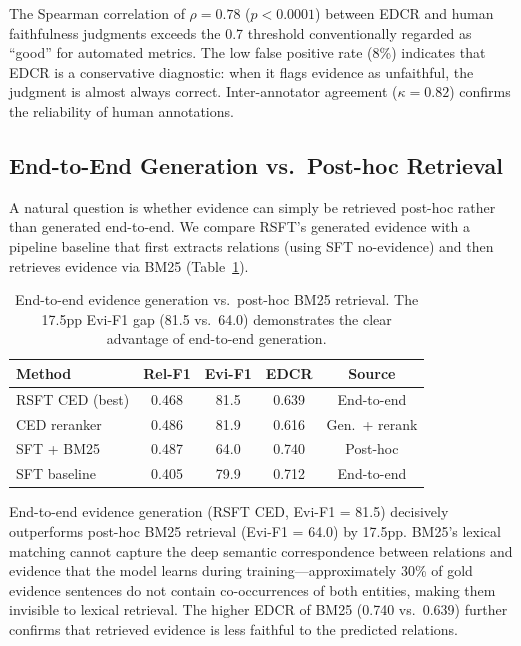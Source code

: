 \documentclass[11pt,a4paper]{article}
\begin{document}
The Spearman correlation of $\rho=0.78$ ($p < 0.0001$) between EDCR and human faithfulness judgments exceeds the 0.7 threshold conventionally regarded as ``good'' for automated metrics.
The low false positive rate (8\%) indicates that EDCR is a conservative diagnostic: when it flags evidence as unfaithful, the judgment is almost always correct.
Inter-annotator agreement ($\kappa = 0.82$) confirms the reliability of human annotations.

\subsection{End-to-End Generation vs.\ Post-hoc Retrieval}
\label{sec:posthoc}

A natural question is whether evidence can simply be retrieved post-hoc rather than generated end-to-end.
We compare RSFT's generated evidence with a pipeline baseline that first extracts relations (using SFT no-evidence) and then retrieves evidence via BM25 (Table~\ref{tab:posthoc}).

\begin{table}[t]
\centering
\small
\begin{tabular}{lcccc}
\toprule
\textbf{Method} & \textbf{Rel-F1} & \textbf{Evi-F1} & \textbf{EDCR} & \textbf{Source} \\
\midrule
RSFT CED (best) & 0.468 & 81.5 & 0.639 & End-to-end \\
CED reranker & 0.486 & 81.9 & 0.616 & Gen.\ + rerank \\
SFT + BM25 & 0.487 & 64.0 & 0.740 & Post-hoc \\
SFT baseline & 0.405 & 79.9 & 0.712 & End-to-end \\
\bottomrule
\end{tabular}
\caption{End-to-end evidence generation vs.\ post-hoc BM25 retrieval. The 17.5pp Evi-F1 gap (81.5 vs.\ 64.0) demonstrates the clear advantage of end-to-end generation.}
\label{tab:posthoc}
\end{table}

End-to-end evidence generation (RSFT CED, Evi-F1 = 81.5) decisively outperforms post-hoc BM25 retrieval (Evi-F1 = 64.0) by 17.5pp.
BM25's lexical matching cannot capture the deep semantic correspondence between relations and evidence that the model learns during training---approximately 30\% of gold evidence sentences do not contain co-occurrences of both entities, making them invisible to lexical retrieval.
The higher EDCR of BM25 (0.740 vs.\ 0.639) further confirms that retrieved evidence is less faithful to the predicted relations.
\end{document}
